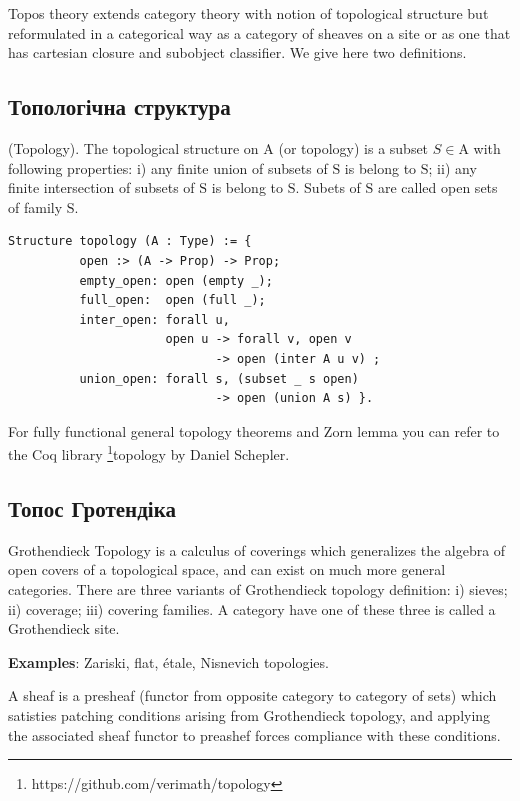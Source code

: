 \begin{definition}
Topos theory extends category theory with notion of topological
structure but reformulated in a categorical way
as a category of sheaves on a site or as one that has cartesian closure
and subobject classifier. We give here two definitions.

\subsection{Топологічна структура}

\begin{definition} (Topology). The topological structure on $\mathrm{A}$
(or topology) is a subset $S \in \mathrm{A}$ with following properties:
i) any finite union of subsets of $\mathrm{S}$ is belong to $\mathrm{S}$;
ii) any finite intersection of subsets of $\mathrm{S}$ is belong to $\mathrm{S}$.
Subets of $\mathrm{S}$ are called open sets of family $\mathrm{S}$.
\begin{lstlisting}
Structure topology (A : Type) := {
          open :> (A -> Prop) -> Prop;
          empty_open: open (empty _);
          full_open:  open (full _);
          inter_open: forall u,
                      open u -> forall v, open v
                             -> open (inter A u v) ;
          union_open: forall s, (subset _ s open)
                             -> open (union A s) }.
\end{lstlisting}
For fully functional general topology theorems and Zorn lemma you can refer to
the Coq library \footnote{https://github.com/verimath/topology}{topology} by Daniel Schepler.
\end{definition}

\subsection{Топос Гротендіка}

Grothendieck Topology is a calculus of coverings which generalizes the algebra
of open covers of a topological space, and can exist on much more general categories.
There are three variants of Grothendieck topology definition:
i) sieves; ii) coverage; iii) covering families.
A category have one of these three is called a Grothendieck site.

{\bf Examples}: Zariski, flat, étale, Nisnevich topologies.

A sheaf is a presheaf (functor from opposite category to category of sets) which
satisties patching conditions arising from Grothendieck topology, and applying
the associated sheaf functor to preashef forces compliance with these conditions.


\end{definition}
